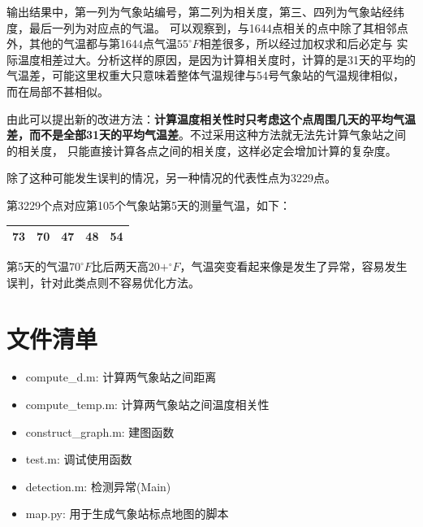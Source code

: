 \documentclass[a4paper]{ctexart}
\begin{document}
输出结果中，第一列为气象站编号，第二列为相关度，第三、四列为气象站经纬度，最后一列为对应点的气温。
可以观察到，与1644点相关的点中除了其相邻点外，其他的气温都与第1644点气温$55^\circ F$相差很多，所以经过加权求和后必定与
实际温度相差过大。分析这样的原因，是因为计算相关度时，计算的是31天的平均的气温差，可能这里权重大只意味着整体气温规律与54号气象站的气温规律相似，
而在局部不甚相似。

由此可以提出新的改进方法：\textbf{计算温度相关性时只考虑这个点周围几天的平均气温差，而不是全部31天的平均气温差}。不过采用这种方法就无法先计算气象站之间的相关度，
只能直接计算各点之间的相关度，这样必定会增加计算的复杂度。

除了这种可能发生误判的情况，另一种情况的代表性点为3229点。

第3229个点对应第105个气象站第5天的测量气温，如下：

\begin{tabular}{|c|c|c|c|c|}
    \hline
    73 & \bfseries{70} & 47 & 48 & 54 \\
    \hline
\end{tabular}

第5天的气温$70^\circ F$比后两天高$20+^\circ F$，气温突变看起来像是发生了异常，容易发生误判，针对此类点则不容易优化方法。

\section{文件清单}
\begin{itemize}
    \item compute\_d.m: 计算两气象站之间距离
    \item compute\_temp.m: 计算两气象站之间温度相关性
    \item construct\_graph.m: 建图函数
    \item test.m: 调试使用函数
    \item detection.m: 检测异常(Main)
    \item map.py: 用于生成气象站标点地图的脚本
\end{itemize}





\end{document}
